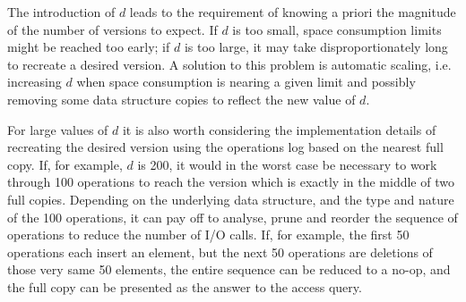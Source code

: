 The introduction of $d$ leads to the requirement of knowing a priori the
magnitude of the number of versions to expect. If $d$ is too small, space
consumption limits might be reached too early; if $d$ is too large, it may take
disproportionately long to recreate a desired version. A solution to this
problem is automatic scaling, i.e. increasing $d$ when space consumption is
nearing a given limit and possibly removing some data structure copies to
reflect the new value of $d$.

For large values of $d$ it is also worth considering the implementation details
of recreating the desired version using the operations log based on the
nearest full copy. If, for example, $d$ is 200, it would in the worst case be
necessary to work through 100 operations to reach the version which is exactly
in the middle of two full copies. Depending on the underlying data structure,
and the type and nature of the 100 operations, it can pay off to analyse,
prune and reorder the sequence of operations to reduce the number of I/O calls.
If, for example, the first 50 operations each insert an element, but the next 50
operations are deletions of those very same 50 elements, the entire sequence can
be reduced to a no-op, and the full copy can be presented as the answer to the
access query.

